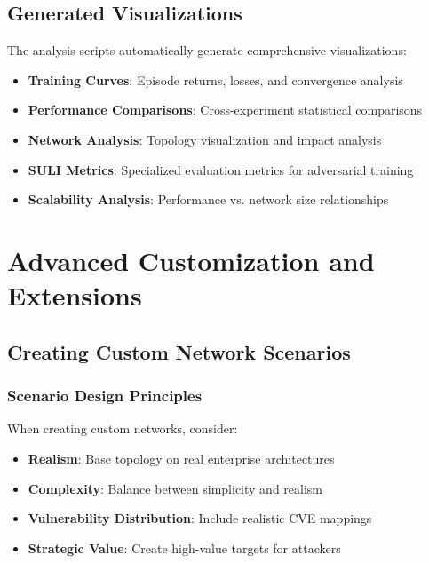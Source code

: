 \documentclass[12pt,a4paper]{article}
\begin{document}
\subsection{Generated Visualizations}

The analysis scripts automatically generate comprehensive visualizations:

\begin{itemize}
    \item \textbf{Training Curves}: Episode returns, losses, and convergence analysis
    \item \textbf{Performance Comparisons}: Cross-experiment statistical comparisons
    \item \textbf{Network Analysis}: Topology visualization and impact analysis
    \item \textbf{SULI Metrics}: Specialized evaluation metrics for adversarial training
    \item \textbf{Scalability Analysis}: Performance vs. network size relationships
\end{itemize}

\section{Advanced Customization and Extensions}

\subsection{Creating Custom Network Scenarios}

\subsubsection{Scenario Design Principles}
When creating custom networks, consider:
\begin{itemize}
    \item \textbf{Realism}: Base topology on real enterprise architectures
    \item \textbf{Complexity}: Balance between simplicity and realism
    \item \textbf{Vulnerability Distribution}: Include realistic CVE mappings
    \item \textbf{Strategic Value}: Create high-value targets for attackers
\end{itemize}
\end{document}
